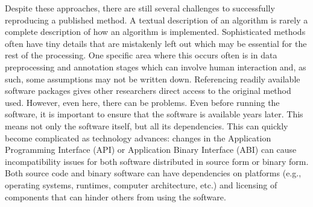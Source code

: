 Despite these approaches, there are still several challenges to successfully
reproducing a published method.
{ %
	A textual description of an algorithm is rarely a complete description of
	how an algorithm is implemented. Sophisticated methods often have tiny details
	that are mistakenly left out which may be essential for the rest of the
	processing. One specific area where this occurs often is
	in data preprocessing and annotation stages which can
	involve human interaction and, as such, some assumptions
	may not be written down.
}
{ %
	Referencing readily available software packages gives
	other researchers direct access to the original method
	used. However, even here, there can be problems.
	Even before running the software, it is important to
	ensure that the
	software is available years later. This means not only the software itself, but
	all its dependencies. This can quickly become complicated as technology
	advances: changes in the Application Programming Interface (API) or Application
	Binary Interface (ABI) can cause incompatibility issues for both
	software distributed in source form or
	binary form. Both source code and binary software can have
	dependencies on platforms (e.g., operating systems,
	runtimes, computer architecture, etc.) and licensing of
	components that can hinder others from using the software.
}

